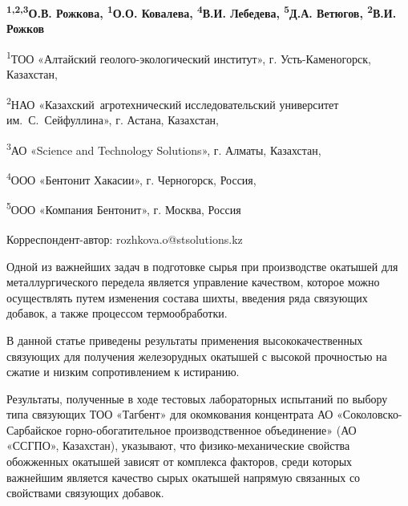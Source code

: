 \vspace{-0.5em}
\begin{articleheader}

{\bfseries
\textsuperscript{1,2,3}О.В. Рожкова\textsuperscript{\envelope },
\textsuperscript{1}О.О. Ковалева,
\textsuperscript{4}В.И. Лебедева,
\textsuperscript{5}Д.А. Ветюгов,
\textsuperscript{2}В.И. Рожков
}
\end{articleheader}

\begin{affiliation}
\textsuperscript{1}ТОО «Алтайский геолого-экологический институт», г. Усть-Каменогорск, Казахстан,

\textsuperscript{2}НАО «Казахский~агротехнический исследовательский университет им.~С.~Сейфуллина», г. Астана, Казахстан,

\textsuperscript{3}АО «Science and Technology Solutions», г. Алматы, Казахстан,

\textsuperscript{4}ООО «Бентонит Хакасии», г. Черногорск, Россия,

\textsuperscript{5}ООО «Компания Бентонит», г. Москва, Россия

\raggedright \textsuperscript{\envelope }Корреспондент-автор: rozhkova.o@stsolutions.kz
\end{affiliation}

Одной из важнейших задач в подготовке сырья при производстве окатышей
для металлургического передела является управление качеством, которое
можно осуществлять путем изменения состава шихты, введения ряда
связующих добавок, а также процессом термообработки.

В данной статье приведены результаты применения высококачественных
связующих для получения железорудных окатышей с высокой прочностью на
сжатие и низким сопротивлением к истиранию.

Результаты, полученные в ходе тестовых лабораторных испытаний по выбору
типа связующих ТОО «Тагбент» для окомкования концентрата АО
«Соколовско-Сарбайское горно-обогатительное производственное
объединение» (АО «ССГПО», Казахстан), указывают, что физико-механические
свойства обожженных окатышей зависят от комплекса факторов, среди
которых важнейшим является качество сырых окатышей напрямую связанных со
свойствами связующих добавок.

